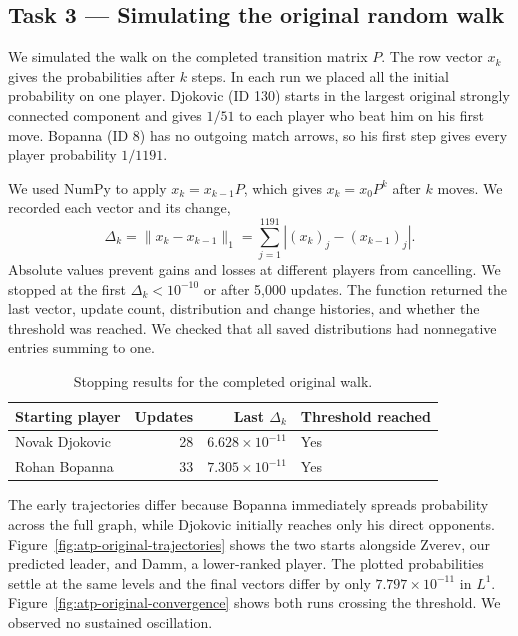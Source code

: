 
\subsection{Task 3 --- Simulating the original random walk}
\label{subsec:atp-original-walk}

We simulated the walk on the completed transition matrix \(P\).
The row vector \(x_k\) gives the probabilities after \(k\) steps.
In each run we placed all the initial probability on one player.
Djokovic (ID 130) starts in the largest original strongly connected
component and gives \(1/51\) to each player who beat him on his first move.
Bopanna (ID 8) has no outgoing match arrows, so his first step gives
every player probability \(1/1191\).

We used NumPy to apply \(x_k=x_{k-1}P\), which gives \(x_k=x_0P^k\)
after \(k\) moves. We recorded each vector and its change,
\[
\Delta_k=\lVert x_k-x_{k-1}\rVert_1
=\sum_{j=1}^{1191}\left|(x_k)_j-(x_{k-1})_j\right|.
\]
Absolute values prevent gains and losses at different players from
cancelling. We stopped at the first \(\Delta_k<10^{-10}\) or after 5,000
updates. The function returned the last vector, update count, distribution
and change histories, and whether the threshold was reached. We checked
that all saved distributions had nonnegative entries summing to one.

\begin{table}[htbp]
  \centering
  \caption{Stopping results for the completed original walk.}
  \label{tab:atp-original-stopping}
  \begin{tabular}{lrrl}
    \hline
    Starting player & Updates & Last \(\Delta_k\) & Threshold reached \\
    \hline
    Novak Djokovic & 28 & \(6.628\times 10^{-11}\) & Yes \\
    Rohan Bopanna & 33 & \(7.305\times 10^{-11}\) & Yes \\
    \hline
  \end{tabular}
\end{table}

The early trajectories differ because Bopanna immediately spreads
probability across the full graph, while Djokovic initially reaches only
his direct opponents. Figure~\ref{fig:atp-original-trajectories} shows
the two starts alongside Zverev, our predicted leader, and Damm, a
lower-ranked player. The plotted probabilities settle at the same levels
and the final vectors differ by only \(7.797\times10^{-11}\) in \(L^1\).
Figure~\ref{fig:atp-original-convergence} shows both runs crossing the
threshold. We observed no sustained oscillation.

